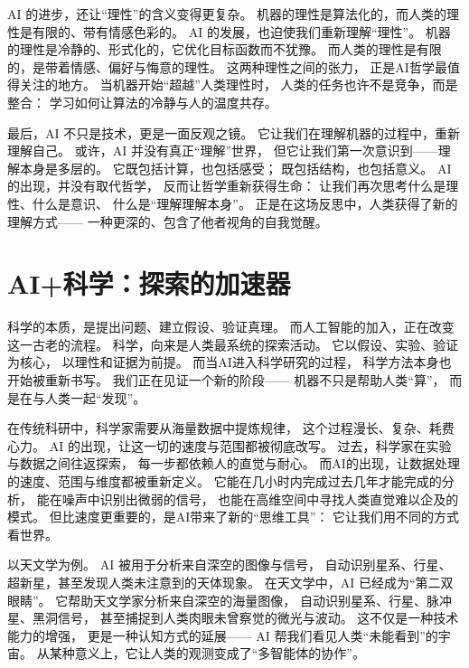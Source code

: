 AI 的进步，还让“理性”的含义变得更复杂。  
机器的理性是算法化的，而人类的理性是有限的、带有情感色彩的。  
AI 的发展，也迫使我们重新理解“理性”。  
机器的理性是冷静的、形式化的，它优化目标函数而不犹豫。  
而人类的理性是有限的，是带着情感、偏好与悔意的理性。  
这两种理性之间的张力，  
正是AI哲学最值得关注的地方。  
当机器开始“超越”人类理性时，  
人类的任务也许不是竞争，而是整合：  
学习如何让算法的冷静与人的温度共存。

最后，AI 不只是技术，更是一面反观之镜。  
它让我们在理解机器的过程中，重新理解自己。  
或许，AI 并没有真正“理解”世界，  
但它让我们第一次意识到——理解本身是多层的。  
它既包括计算，也包括感受；  
既包括结构，也包括意义。  
AI 的出现，并没有取代哲学，  
反而让哲学重新获得生命：  
让我们再次思考什么是理性、什么是意识、  
什么是“理解理解本身”。  
正是在这场反思中，人类获得了新的理解方式——  
一种更深的、包含了他者视角的自我觉醒。

\section{AI+科学：探索的加速器}

科学的本质，是提出问题、建立假设、验证真理。  
而人工智能的加入，正在改变这一古老的流程。  
科学，向来是人类最系统的探索活动。  
它以假设、实验、验证为核心，  
以理性和证据为前提。  
而当AI进入科学研究的过程，  
科学方法本身也开始被重新书写。  
我们正在见证一个新的阶段——  
机器不只是帮助人类“算”，  
而是在与人类一起“发现”。

在传统科研中，科学家需要从海量数据中提炼规律，  
这个过程漫长、复杂、耗费心力。  
AI 的出现，让这一切的速度与范围都被彻底改写。  
过去，科学家在实验与数据之间往返探索，  
每一步都依赖人的直觉与耐心。  
而AI的出现，让数据处理的速度、范围与维度都被重新定义。  
它能在几小时内完成过去几年才能完成的分析，  
能在噪声中识别出微弱的信号，  
也能在高维空间中寻找人类直觉难以企及的模式。  
但比速度更重要的，是AI带来了新的“思维工具”：  
它让我们用不同的方式看世界。

以天文学为例。  
AI 被用于分析来自深空的图像与信号，  
自动识别星系、行星、超新星，甚至发现人类未注意到的天体现象。  
在天文学中，AI 已经成为“第二双眼睛”。  
它帮助天文学家分析来自深空的海量图像，  
自动识别星系、行星、脉冲星、黑洞信号，  
甚至捕捉到人类肉眼未曾察觉的微光与波动。  
这不仅是一种技术能力的增强，  
更是一种认知方式的延展——  
AI 帮我们看见人类“未能看到”的宇宙。  
从某种意义上，它让人类的观测变成了“多智能体的协作”。

